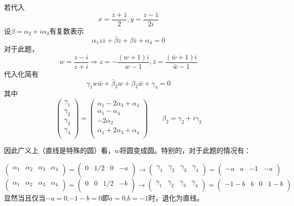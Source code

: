\documentclass[a4paper]{ctexart}
\begin{document}
若代入
$$
x=\frac{z+\bar{z}}{2},y=\frac{z-\bar{z}}{2i}
$$
设$\beta =\alpha _2+i\alpha _3$有复数表示
$$
\alpha _1z\bar{z}+\bar{\beta}z+\beta \bar{z}+\alpha _4=0
$$
对于此题，
$$
w=\frac{z-i}{z+i}\Rightarrow z=-\frac{\left( w+1 \right) i}{w-1},\bar{z}=\frac{\left( \bar{w}+1 \right) i}{\bar{w}-1}
$$
代入化简有
$$
\gamma _1w\bar{w}+\bar{\beta}_2w+\beta _2\bar{w}+\gamma _4=0
$$
其中
$$
\left( \begin{array}{c}
	\gamma _1\\
	\gamma _2\\
	\gamma _3\\
	\gamma _4\\
\end{array} \right) =\left( \begin{array}{c}
	\alpha _1-2\alpha _3+\alpha _4\\
	\alpha _1-\alpha _4\\
	-2\alpha _2\\
	\alpha _1+2\alpha _3+\alpha _4\\
\end{array} \right) \qquad \beta _2=\gamma _2+i\gamma _3
$$

因此广义上（直线是特殊的圆）看，$w$将圆变成圆。特别的，对于此题的情况有：

$$
\left( \begin{matrix}
	\alpha _1&		\alpha _2&		\alpha _3&		\alpha _4\\
\end{matrix} \right) =\left( \begin{matrix}
	0&		1/2&		0&		-a\\
\end{matrix} \right) \rightarrow \left( \begin{matrix}
	\gamma _1&		\gamma _2&		\gamma _3&		\gamma _4\\
\end{matrix} \right) =\left( \begin{matrix}
	-a&		a&		-1&		-a\\
\end{matrix} \right) 
$$
$$
\left( \begin{matrix}
	\alpha _1&		\alpha _2&		\alpha _3&		\alpha _4\\
\end{matrix} \right) =\left( \begin{matrix}
	0&		0&		1/2&		-b\\
\end{matrix} \right) \rightarrow \left( \begin{matrix}
	\gamma _1&		\gamma _2&		\gamma _3&		\gamma _4\\
\end{matrix} \right) =\left( \begin{matrix}
	-1-b&		b&		0&		1-b\\
\end{matrix} \right) 
$$
显然当且仅当$-a=0$,$-1-b=0$即$a=0$,$b=-1$时，退化为直线。
\end{document}
